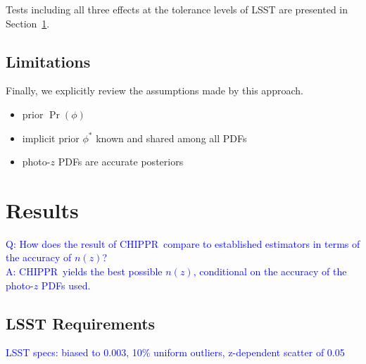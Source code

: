 \documentclass[iop]{emulateapj}
\newcommand{\chippr}{CHIPPR}
\newcommand{\pzpdf}{photo-$z$ PDF}
\begin{document}
Tests including all three effects at the tolerance levels of LSST are presented in Section~\ref{sec:results}.

\subsection{Limitations}
\label{sec:limitations}

Finally, we explicitly review the assumptions made by this approach.
\begin{itemize}
  \item prior $\Pr(\phi)$
  \item implicit prior $\phi^{*}$ known and shared among all PDFs
	\item \pzpdf s are accurate posteriors
	\end{itemize}

\section{Results}
\label{sec:results}

\textcolor{blue}{Q: How does the result of \chippr\ compare to established estimators in terms of the accuracy of $n(z)$?\\
A: \chippr\ yields the best possible $n(z)$, conditional on the accuracy of the photo-$z$ PDFs used.}

\subsection{LSST Requirements}
\label{sec:lsstdemo}

\textcolor{blue}{LSST specs: biased to 0.003, 10\% uniform outliers, z-dependent scatter of 0.05}
\end{document}
